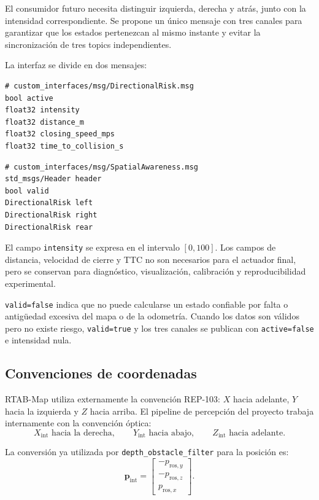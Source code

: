 El consumidor futuro necesita distinguir izquierda, derecha y atrás, junto
con la intensidad correspondiente. Se propone un único mensaje con tres
canales para garantizar que los estados pertenezcan al mismo instante y evitar
la sincronización de tres topics independientes.

La interfaz se divide en dos mensajes:

\begin{verbatim}
# custom_interfaces/msg/DirectionalRisk.msg
bool active
float32 intensity
float32 distance_m
float32 closing_speed_mps
float32 time_to_collision_s
\end{verbatim}

\begin{verbatim}
# custom_interfaces/msg/SpatialAwareness.msg
std_msgs/Header header
bool valid
DirectionalRisk left
DirectionalRisk right
DirectionalRisk rear
\end{verbatim}

El campo \texttt{intensity} se expresa en el intervalo $[0,100]$. Los campos
de distancia, velocidad de cierre y TTC no son necesarios para el actuador
final, pero se conservan para diagnóstico, visualización, calibración y
reproducibilidad experimental.

\texttt{valid=false} indica que no puede calcularse un estado confiable por
falta o antigüedad excesiva del mapa o de la odometría. Cuando los datos son
válidos pero no existe riesgo, \texttt{valid=true} y los tres canales se
publican con \texttt{active=false} e intensidad nula.

\subsection{Convenciones de coordenadas}
\label{subsec:sa-frames}

RTAB-Map utiliza externamente la convención REP-103: $X$ hacia adelante, $Y$
hacia la izquierda y $Z$ hacia arriba. El pipeline de percepción del proyecto
trabaja internamente con la convención óptica:
%
\begin{equation}
  X_{\text{int}} \text{ hacia la derecha}, \qquad
  Y_{\text{int}} \text{ hacia abajo}, \qquad
  Z_{\text{int}} \text{ hacia adelante}.
\end{equation}

La conversión ya utilizada por \texttt{depth\_obstacle\_filter} para la
posición es:
%
\begin{equation}
  \label{eq:sa-rtab-position}
  \mathbf{p}_{\text{int}}
  =
  \begin{bmatrix}
    -p_{\text{ros},y} \\
    -p_{\text{ros},z} \\
     p_{\text{ros},x}
  \end{bmatrix}.
\end{equation}

